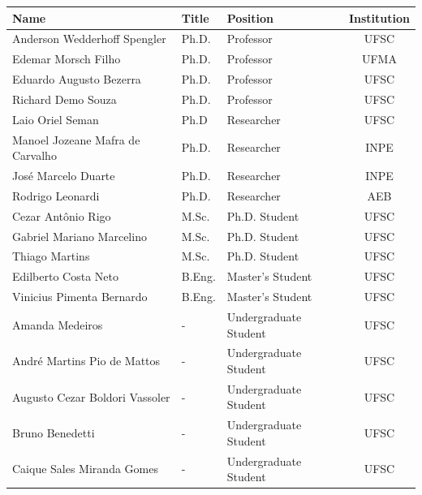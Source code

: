 \begin{table}[ht]
    \centering
    \begin{tabular}{lllc}
        \toprule[1.5pt]
        \textbf{Name} & \textbf{Title} & \textbf{Position} & \textbf{Institution} \\
        \midrule
        Anderson Wedderhoff Spengler        & Ph.D.     & Professor             & UFSC \\
        Edemar Morsch Filho                 & Ph.D.     & Professor             & UFMA \\
        Eduardo Augusto Bezerra             & Ph.D.     & Professor             & UFSC \\
        Richard Demo Souza                  & Ph.D.     & Professor             & UFSC \\
        Laio Oriel Seman                    & Ph.D      & Researcher            & UFSC \\
        Manoel Jozeane Mafra de Carvalho    & Ph.D.     & Researcher            & INPE \\
        José Marcelo Duarte                 & Ph.D.     & Researcher            & INPE \\
        Rodrigo Leonardi                    & Ph.D.     & Researcher            & AEB \\
        Cezar Antônio Rigo                  & M.Sc.     & Ph.D. Student         & UFSC \\
        Gabriel Mariano Marcelino           & M.Sc.     & Ph.D. Student         & UFSC \\
        Thiago Martins                      & M.Sc.     & Ph.D. Student         & UFSC \\
        Edilberto Costa Neto                & B.Eng.    & Master's Student      & UFSC \\
        Vinicius Pimenta Bernardo           & B.Eng.    & Master's Student      & UFSC \\
        Amanda Medeiros                     & -         & Undergraduate Student & UFSC \\
        André Martins Pio de Mattos         & -         & Undergraduate Student & UFSC \\
        Augusto Cezar Boldori Vassoler      & -         & Undergraduate Student & UFSC \\
        Bruno Benedetti                     & -         & Undergraduate Student & UFSC \\
        Caique Sales Miranda Gomes          & -         & Undergraduate Student & UFSC \\

\end{tabular}
\end{table}
